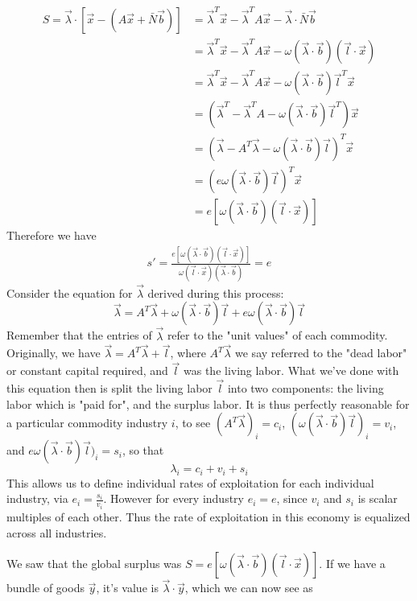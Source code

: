 \documentclass{article}
\theoremstyle{definition}
\theoremstyle{plain}
\theoremstyle{theorem}
\begin{document}
\begin{align*}
	S = \vec{\lambda}\cdot [\vec{x} - (A\vec{x} + \bar{N}\vec{b})] &= \vec{\lambda}^T\vec{x} - \vec{\lambda}^T A\vec{x} - \vec{\lambda}\cdot \bar{N} \vec{b} \\
	&= \vec{\lambda}^T\vec{x} - \vec{\lambda}^T A\vec{x} - \omega (\vec{\lambda} \cdot \vec{b})(\vec{l} \cdot \vec{x}) \\
	&= \vec{\lambda}^T\vec{x} - \vec{\lambda}^T A\vec{x} - \omega (\vec{\lambda} \cdot \vec{b})\vec{l}^T\vec{x} \\
	&= (\vec{\lambda}^T - \vec{\lambda}^T A - \omega (\vec{\lambda} \cdot \vec{b})\vec{l}^T)\vec{x} \\
	&= (\vec{\lambda} - A^T\vec{\lambda} - \omega(\vec{\lambda}\cdot \vec{b})\vec{l})^T\vec{x} \\
	&= (e\omega(\vec{\lambda}\cdot\vec{b})\vec{l})^T\vec{x} \\
	&= e[\omega(\vec{\lambda} \cdot \vec{b})(\vec{l}\cdot \vec{x})]
\end{align*}
Therefore we have
\begin{align*} 
s' = \frac{e[\omega(\vec{\lambda} \cdot \vec{b})(\vec{l}\cdot \vec{x})]}{\omega (\vec{l} \cdot \vec{x})(\vec{\lambda} \cdot \vec{b})} = e
\end{align*}
Consider the equation for $\vec{\lambda}$ derived during this process:
\[ \vec{\lambda} = A^T\vec{\lambda} + \omega(\vec{\lambda}\cdot\vec{b})\vec{l} + e\omega(\vec{\lambda}\cdot\vec{b})\vec{l} \]
Remember that the entries of $\vec{\lambda}$ refer to the "unit values" of each commodity. Originally, we have $\vec{\lambda} = A^T\vec{\lambda} + \vec{l}$, where $A^T\vec{\lambda}$ we say referred to the "dead labor" or constant capital required, and $\vec{l}$ was the living labor. What we've done with this equation then is split the living labor $\vec{l}$ into two components: the living labor which is "paid for", and the surplus labor. It is thus perfectly reasonable for a particular commodity industry $i$, to see $(A^T\vec{\lambda})_i = c_i$, $(\omega(\vec{\lambda}\cdot\vec{b})\vec{l})_i = v_i$, and $e\omega(\vec{\lambda}\cdot\vec{b})\vec{l})_i = s_i$, so that
\[ \lambda_i = c_i + v_i + s_i \]
This allows us to define individual rates of exploitation for each individual industry, via $e_i = \frac{s_i}{v_i}$. However for every industry $e_i = e$, since $v_i$ and $s_i$ is scalar multiples of each other. Thus the rate of exploitation in this economy is equalized across all industries. \par 
We saw that the global surplus was $S = e[\omega(\vec{\lambda} \cdot \vec{b})(\vec{l}\cdot \vec{x})]$. If we have a bundle of goods $\vec{y}$, it's value is $\vec{\lambda} \cdot \vec{y}$, which we can now see as 
\end{document}
